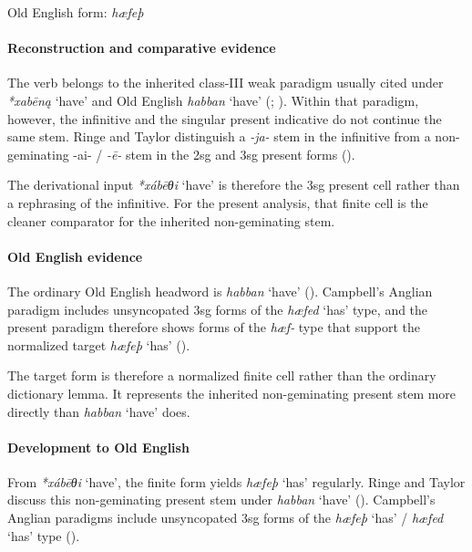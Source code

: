 \documentclass[
  british,
  a4paper,
]{article}
\providecommand{\Recon}[1]{\emph{*#1}}
\begin{document}
Old English form: \emph{hæfeþ}

\paragraph{Reconstruction and comparative
evidence}\label{reconstruction-and-comparative-evidence-132}

The verb belongs to the inherited class-III weak paradigm usually cited
under \Recon{xabēną} `have' and Old English {\emph{habban}} `have'
(;
). Within that
paradigm, however, the infinitive and the singular present indicative do
not continue the same stem. Ringe and Taylor distinguish a \emph{-ja-}
stem in the infinitive from a non-geminating -ai- / \emph{-ē-} stem in
the 2sg and 3sg present forms ().

The derivational input \Recon{xábēθi} `have' is therefore the 3sg
present cell rather than a rephrasing of the infinitive. For the present
analysis, that finite cell is the cleaner comparator for the inherited
non-geminating stem.

\paragraph{Old English evidence}\label{old-english-evidence-134}

The ordinary Old English headword is {\emph{habban}} `have'
(). Campbell's Anglian
paradigm includes unsyncopated 3sg forms of the {\emph{hæfed}} `has'
type, and the present paradigm therefore shows forms of the \emph{hæf-}
type that support the normalized target {\emph{hæfeþ}} `has'
().

The target form is therefore a normalized finite cell rather than the
ordinary dictionary lemma. It represents the inherited non-geminating
present stem more directly than {\emph{habban}} `have' does.

\paragraph{Development to Old
English}\label{development-to-old-english-132}

From \Recon{xábēθi} `have', the finite form yields {\emph{hæfeþ}} `has'
regularly. Ringe and Taylor discuss this non-geminating present stem
under {\emph{habban}} `have' (). Campbell's Anglian paradigms include unsyncopated
3sg forms of the {\emph{hæfeþ}} `has' / {\emph{hæfed}} `has' type
().
\end{document}
